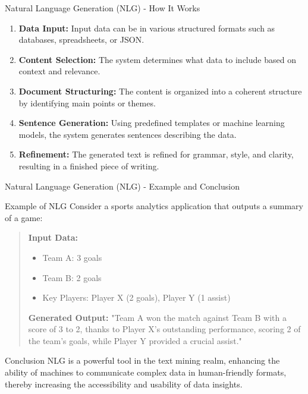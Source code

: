 \documentclass[aspectratio=169]{beamer}
\begin{document}
\begin{frame}[fragile]{Natural Language Generation (NLG) - How It Works}
    \begin{enumerate}
        \item \textbf{Data Input:} Input data can be in various structured formats such as databases, spreadsheets, or JSON.
        \item \textbf{Content Selection:} The system determines what data to include based on context and relevance.
        \item \textbf{Document Structuring:} The content is organized into a coherent structure by identifying main points or themes.
        \item \textbf{Sentence Generation:} Using predefined templates or machine learning models, the system generates sentences describing the data.
        \item \textbf{Refinement:} The generated text is refined for grammar, style, and clarity, resulting in a finished piece of writing.
    \end{enumerate}
\end{frame}

\begin{frame}[fragile]{Natural Language Generation (NLG) - Example and Conclusion}
    \begin{block}{Example of NLG}
        Consider a sports analytics application that outputs a summary of a game:
        \begin{quote}
            \textbf{Input Data:} 
            \begin{itemize}
                \item Team A: 3 goals
                \item Team B: 2 goals
                \item Key Players: Player X (2 goals), Player Y (1 assist)
            \end{itemize}
            \textbf{Generated Output:} 
            "Team A won the match against Team B with a score of 3 to 2, thanks to Player X's outstanding performance, scoring 2 of the team's goals, while Player Y provided a crucial assist."
        \end{quote}
    \end{block}
    \begin{block}{Conclusion}
        NLG is a powerful tool in the text mining realm, enhancing the ability of machines to communicate complex data in human-friendly formats, thereby increasing the accessibility and usability of data insights.
    \end{block}
\end{frame}
\end{document}
